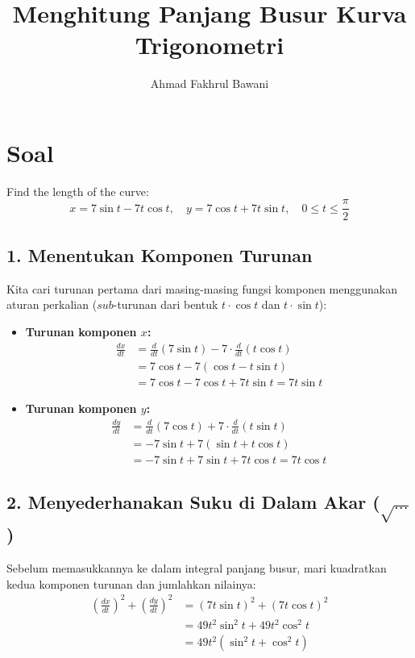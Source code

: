 \documentclass[12pt,a4paper]{article}
\title{Menghitung Panjang Busur Kurva Trigonometri}
\author{Ahmad Fakhrul Bawani}
\date{}
\begin{document}
\maketitle

\section*{Soal}

Find the length of the curve:
\begin{equation*}
  x = 7\sin t - 7t\cos t, \quad y = 7\cos t + 7t\sin t, \quad 0 \le t \le \frac{\pi}{2}
\end{equation*}

\subsection*{1. Menentukan Komponen Turunan}
Kita cari turunan pertama dari masing-masing fungsi komponen menggunakan aturan perkalian ($sub$-turunan dari bentuk $t \cdot \cos t$ dan $t \cdot \sin t$):

\begin{itemize}
  \item \textbf{Turunan komponen $x$:}
    \begin{align*}
      \frac{dx}{dt} &= \frac{d}{dt}(7\sin t) - 7 \cdot \frac{d}{dt}(t\cos t) \\
      &= 7\cos t - 7(\cos t - t\sin t) \\
      &= 7\cos t - 7\cos t + 7t\sin t = 7t\sin t
    \end{align*}

  \item \textbf{Turunan komponen $y$:}
    \begin{align*}
      \frac{dy}{dt} &= \frac{d}{dt}(7\cos t) + 7 \cdot \frac{d}{dt}(t\sin t) \\
      &= -7\sin t + 7(\sin t + t\cos t) \\
      &= -7\sin t + 7\sin t + 7t\cos t = 7t\cos t
    \end{align*}
\end{itemize}

\subsection*{2. Menyederhanakan Suku di Dalam Akar ($\sqrt{\dots}$)}
Sebelum memasukkannya ke dalam integral panjang busur, mari kuadratkan kedua komponen turunan dan jumlahkan nilainya:
\begin{align*}
  \left(\frac{dx}{dt}\right)^2 + \left(\frac{dy}{dt}\right)^2 &= (7t\sin t)^2 + (7t\cos t)^2 \\
  &= 49t^2\sin^2 t + 49t^2\cos^2 t \\
  &= 49t^2(\sin^2 t + \cos^2 t)
\end{align*}
\end{document}
